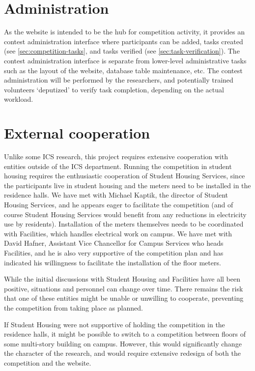 \section{Administration}

As the website is intended to be the hub for competition activity, it provides an contest administration interface where participants can be added, tasks created (see \autoref{sec:competition-tasks}, and tasks verified (see \autoref{sec:task-verification}). The contest administration interface is separate from lower-level administrative tasks such as the layout of the website, database table maintenance, etc. The contest administration will be performed by the researchers, and potentially trained volunteers `deputized' to verify task completion, depending on the actual workload.

\section{External cooperation}
\label{sec:external-cooperation}

Unlike some ICS research, this project requires extensive cooperation with entities outside of the ICS department. Running the competition in student housing requires the enthusiastic cooperation of Student Housing Services, since the participants live in student housing and the meters need to be installed in the residence halls. We have met with Michael Kaptik, the director of Student Housing Services, and he appears eager to facilitate the competition (and of course Student Housing Services would benefit from any reductions in electricity use by residents). Installation of the meters themselves needs to be coordinated with Facilities, which handles electrical work on campus. We have met with David Hafner, Assistant Vice Chancellor for Campus Services who heads Facilities, and he is also very supportive of the competition plan and has indicated his willingness to facilitate the installation of the floor meters.

While the initial discussions with Student Housing and Facilities have all been positive, situations and personnel can change over time. There remains the risk that one of these entities might be unable or unwilling to cooperate, preventing the competition from taking place as planned.

If Student Housing were not supportive of holding the competition in the residence halls, it might be possible to switch to a competition between floors of some multi-story building on campus. However, this would significantly change the character of the research, and would require extensive redesign of both the competition and the website.

